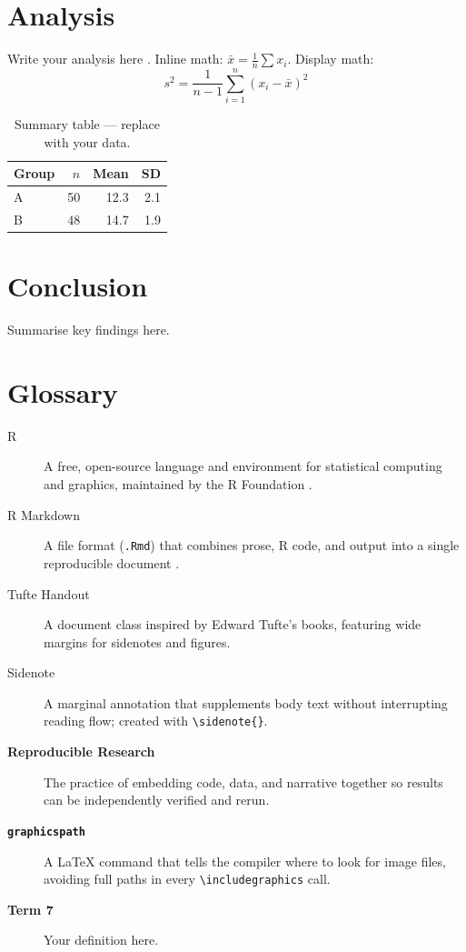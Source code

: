 \documentclass{tufte-handout}
\begin{document}
\section{Analysis}

Write your analysis here \citep{rmarkdown2018, rmarkdown2020}.
Inline math: $\bar{x} = \frac{1}{n}\sum x_i$. Display math:
\[
  s^{2} = \frac{1}{n-1}\sum_{i=1}^{n}(x_i - \bar{x})^{2}
\]

\begin{table}
  \centering
  \caption{Summary table --- replace with your data.}
  \begin{tabular}{lrrr}
    \toprule
    Group & $n$ & Mean & SD \\
    \midrule
    A & 50 & 12.3 & 2.1 \\
    B & 48 & 14.7 & 1.9 \\
    \bottomrule
  \end{tabular}
\end{table}

\section{Conclusion}

Summarise key findings here.

\section{Glossary}

\begin{description}
  \item[R] A free, open-source language and environment for statistical
    computing and graphics, maintained by the R Foundation \citep{R-base}.
  \item[R Markdown] A file format (\texttt{.Rmd}) that combines prose,
    R code, and output into a single reproducible document \citep{R-rmarkdown}.
  \item[Tufte Handout] A document class inspired by Edward Tufte's
    books, featuring wide margins for sidenotes and figures.
  \item[Sidenote] A marginal annotation that supplements body text
    without interrupting reading flow; created with \texttt{\textbackslash sidenote\{\}}.
  \item[\textbf{Reproducible Research}] The practice of embedding code, data,
    and narrative together so results can be independently verified and rerun.
  \item[\textbf{\texttt{graphicspath}}] A \LaTeX{} command that tells the
    compiler where to look for image files, avoiding full paths in every
    \texttt{\textbackslash includegraphics} call.
  \item[\textbf{Term 7}] Your definition here.
\end{description}


\end{document}
